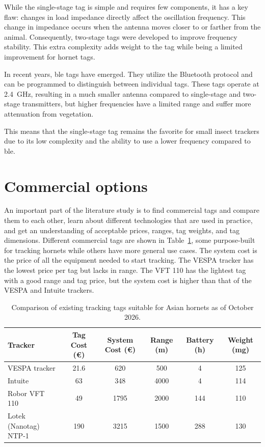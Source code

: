 While the single-stage tag is simple and requires few components, it has a key flaw: changes in load impedance directly affect the oscillation frequency. This change in impedance occurs when the antenna moves closer to or farther from the animal. Consequently, two-stage tags were developed to improve frequency stability. This extra complexity adds weight to the tag while being a limited improvement for hornet tags.

In recent years, \gls{ble} tags have emerged. They utilize the Bluetooth protocol and can be programmed to distinguish between individual tags. These tags operate at 2.4~GHz, resulting in a much smaller antenna compared to single-stage and two-stage transmitters, but higher frequencies have a limited range and suffer more attenuation from vegetation.

This means that the single-stage tag remains the favorite for small insect trackers due to its low complexity and the ability to use a lower frequency compared to \gls{ble}.

\section{Commercial options}

An important part of the literature study is to find commercial tags and compare them to each other, learn about different technologies that are used in practice, and get an understanding of acceptable prices, ranges, tag weights, and tag dimensions. Different commercial tags are shown in Table~\ref{tab:tracking_tags_comparison}, some purpose-built for tracking hornets while others have more general use cases. The system cost is the price of all the equipment needed to start tracking. The VESPA tracker has the lowest price per tag but lacks in range. The VFT 110 has the lightest tag with a good range and tag price, but the system cost is higher than that of the VESPA and Intuite trackers.



\begin{table}[htbp]
	\centering
	\caption{Comparison of existing tracking tags suitable for Asian hornets as of October 2026.}
	\label{tab:tracking_tags_comparison}
	\begin{tabular}{l c c c c c}
		\toprule
		\textbf{Tracker} & \textbf{Tag Cost (€)} & \textbf{System Cost (€)} & \textbf{Range (m)} & \textbf{Battery (h)} & \textbf{Weight (mg)} \\
		\midrule
		VESPA tracker & 21.6 & 620 & 500 & 4 & 125 \\
		Intuite & 63 & 348 & 4000 & 4 & 114 \\
		Robor VFT 110 & 49 & 1795 & 2000 & 144 & 110 \\
		Lotek (Nanotag) NTP-1 & 190 & 3215 & 1500 & 288 & 130 \\
		\bottomrule
	\end{tabular}
\end{table}

